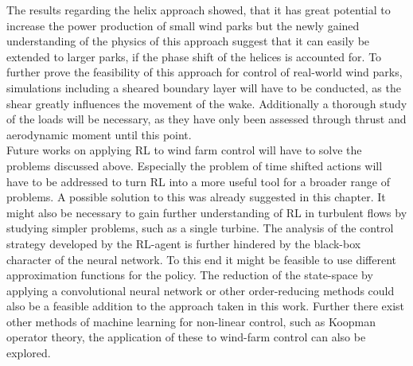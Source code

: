 The results regarding the helix approach showed, that it has great potential to increase the power production of small wind parks but the newly gained understanding of the physics of this approach suggest that it can easily be extended to larger parks, if the phase shift of the helices is accounted for. To further prove the feasibility of this approach for control of real-world wind parks, simulations including a sheared boundary layer will have to be conducted, as the shear greatly influences the movement of the wake. Additionally a thorough study of the loads will be necessary, as they have only been assessed through thrust and aerodynamic moment until this point. \\
Future works on applying RL to wind farm control will have to solve the problems discussed above. Especially the problem of time shifted actions will have to be addressed to turn RL into a more useful tool for a broader range of problems. A possible solution to this was already suggested in this chapter. It might also be necessary to gain further understanding of RL in turbulent flows by studying simpler problems, such as a single turbine. The analysis of the control strategy developed by the RL-agent is further hindered by the black-box character of the neural network. To this end it might be feasible to use different approximation functions for the policy. The reduction of the state-space by applying a convolutional neural network or other order-reducing methods could also be a feasible addition to the approach taken in this work. Further there exist other methods of machine learning for non-linear control, such as Koopman operator theory, the application of these to wind-farm control can also be explored.